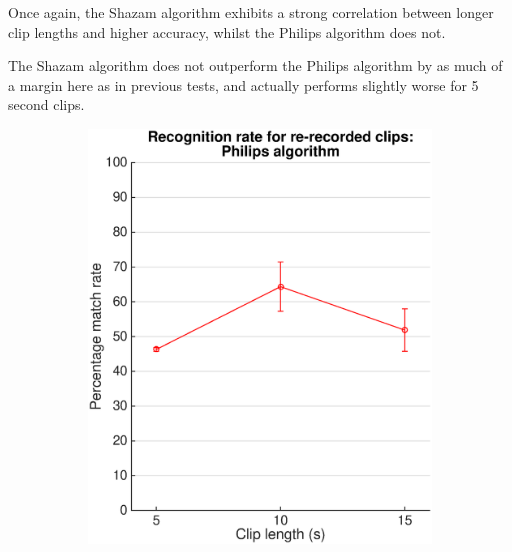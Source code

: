 \documentclass[12pt,a4paper,twoside,openright]{report}
\begin{document}
Once again, the Shazam algorithm exhibits a strong correlation between longer clip lengths and higher accuracy, whilst the Philips algorithm does not.

The Shazam algorithm does not outperform the Philips algorithm by as much of a margin here as in previous tests, and actually performs slightly worse for 5 second clips. 

\begin{figure}[htbp!]
    \centering

    \begin{subfigure}{0.5\textwidth}
    	\centering
     	\includegraphics[width=0.95\linewidth]{./figs/barcoder_passthrough.eps}
    \end{subfigure}%
    ~
    \begin{subfigure}{0.5\textwidth}
    	\centering

\end{subfigure}
\end{figure}
\end{document}
